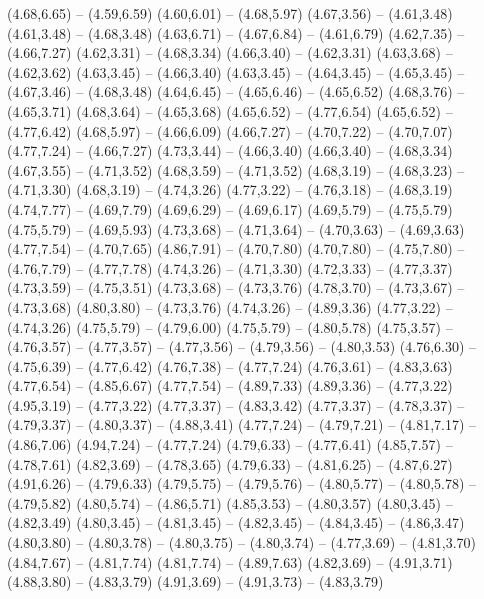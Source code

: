 {  (4.68,6.65) -- (4.59,6.59)
  (4.60,6.01) -- (4.68,5.97)
  (4.67,3.56) -- (4.61,3.48)
  (4.61,3.48) -- (4.68,3.48)
  (4.63,6.71) -- (4.67,6.84) -- (4.61,6.79)
  (4.62,7.35) -- (4.66,7.27)
  (4.62,3.31) -- (4.68,3.34)
  (4.66,3.40) -- (4.62,3.31)
  (4.63,3.68) -- (4.62,3.62)
  (4.63,3.45) -- (4.66,3.40)
  (4.63,3.45) -- (4.64,3.45) -- (4.65,3.45) -- (4.67,3.46) -- (4.68,3.48)
  (4.64,6.45) -- (4.65,6.46) -- (4.65,6.52)
  (4.68,3.76) -- (4.65,3.71)
  (4.68,3.64) -- (4.65,3.68)
  (4.65,6.52) -- (4.77,6.54)
  (4.65,6.52) -- (4.77,6.42)
  (4.68,5.97) -- (4.66,6.09)
  (4.66,7.27) -- (4.70,7.22) -- (4.70,7.07)
  (4.77,7.24) -- (4.66,7.27)
  (4.73,3.44) -- (4.66,3.40)
  (4.66,3.40) -- (4.68,3.34)
  (4.67,3.55) -- (4.71,3.52)
  (4.68,3.59) -- (4.71,3.52)
  (4.68,3.19) -- (4.68,3.23) -- (4.71,3.30)
  (4.68,3.19) -- (4.74,3.26)
  (4.77,3.22) -- (4.76,3.18) -- (4.68,3.19)
  (4.74,7.77) -- (4.69,7.79)
  (4.69,6.29) -- (4.69,6.17)
  (4.69,5.79) -- (4.75,5.79)
  (4.75,5.79) -- (4.69,5.93)
  (4.73,3.68) -- (4.71,3.64) -- (4.70,3.63) -- (4.69,3.63)
  (4.77,7.54) -- (4.70,7.65)
  (4.86,7.91) -- (4.70,7.80)
  (4.70,7.80) -- (4.75,7.80) -- (4.76,7.79) -- (4.77,7.78)
  (4.74,3.26) -- (4.71,3.30)
  (4.72,3.33) -- (4.77,3.37)
  (4.73,3.59) -- (4.75,3.51)
  (4.73,3.68) -- (4.73,3.76)
  (4.78,3.70) -- (4.73,3.67) -- (4.73,3.68)
  (4.80,3.80) -- (4.73,3.76)
  (4.74,3.26) -- (4.89,3.36)
  (4.77,3.22) -- (4.74,3.26)
  (4.75,5.79) -- (4.79,6.00)
  (4.75,5.79) -- (4.80,5.78)
  (4.75,3.57) -- (4.76,3.57) -- (4.77,3.57) -- (4.77,3.56) -- (4.79,3.56) -- (4.80,3.53)
  (4.76,6.30) -- (4.75,6.39) -- (4.77,6.42)
  (4.76,7.38) -- (4.77,7.24)
  (4.76,3.61) -- (4.83,3.63)
  (4.77,6.54) -- (4.85,6.67)
  (4.77,7.54) -- (4.89,7.33)
  (4.89,3.36) -- (4.77,3.22)
  (4.95,3.19) -- (4.77,3.22)
  (4.77,3.37) -- (4.83,3.42)
  (4.77,3.37) -- (4.78,3.37) -- (4.79,3.37) -- (4.80,3.37) -- (4.88,3.41)
  (4.77,7.24) -- (4.79,7.21) -- (4.81,7.17) -- (4.86,7.06)
  (4.94,7.24) -- (4.77,7.24)
  (4.79,6.33) -- (4.77,6.41)
  (4.85,7.57) -- (4.78,7.61)
  (4.82,3.69) -- (4.78,3.65)
  (4.79,6.33) -- (4.81,6.25) -- (4.87,6.27)
  (4.91,6.26) -- (4.79,6.33)
  (4.79,5.75) -- (4.79,5.76) -- (4.80,5.77) -- (4.80,5.78) -- (4.79,5.82)
  (4.80,5.74) -- (4.86,5.71)
  (4.85,3.53) -- (4.80,3.57)
  (4.80,3.45) -- (4.82,3.49)
  (4.80,3.45) -- (4.81,3.45) -- (4.82,3.45) -- (4.84,3.45) -- (4.86,3.47)
  (4.80,3.80) -- (4.80,3.78) -- (4.80,3.75) -- (4.80,3.74) -- (4.77,3.69) -- (4.81,3.70)
  (4.84,7.67) -- (4.81,7.74)
  (4.81,7.74) -- (4.89,7.63)
  (4.82,3.69) -- (4.91,3.71)
  (4.88,3.80) -- (4.83,3.79)
  (4.91,3.69) -- (4.91,3.73) -- (4.83,3.79)
}
